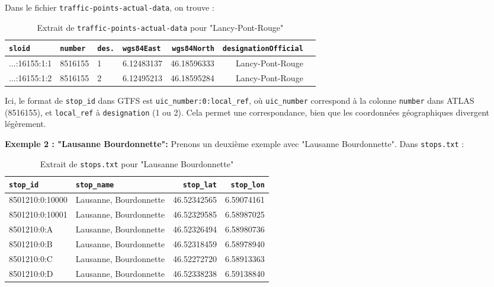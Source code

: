 Dans le fichier \texttt{traffic-points-actual-data}, on trouve :

\begin{table}[H]
\caption{Extrait de \texttt{traffic-points-actual-data} pour "Lancy-Pont-Rouge"}
\label{tab:traffic_lancy_2}
\centering
\begin{tabular}{l l l l r r l}
\toprule
\texttt{sloid} & \texttt{number} & \texttt{des.} & \texttt{wgs84East} & \texttt{wgs84North} & \texttt{designationOfficial} \\
\midrule
...:16155:1:1 & 8516155 & 1  & 6.12483137 & 46.18596333 & Lancy-Pont-Rouge \\
...:16155:1:2 & 8516155 & 2  & 6.12495213 & 46.18595284 & Lancy-Pont-Rouge \\
\bottomrule
\end{tabular}
\end{table}

Ici, le format de \texttt{stop\_id} dans GTFS est \texttt{uic\_number:0:local\_ref}, où \texttt{uic\_number} correspond à la colonne \texttt{number} dans ATLAS (8516155), et \texttt{local\_ref} à \texttt{designation} (1 ou 2). Cela permet une correspondance, bien que les coordonnées géographiques divergent légèrement.

\textbf{Exemple 2 : "Lausanne Bourdonnette":}
\newline
Prenons un deuxième exemple avec "Lausanne Bourdonnette". Dans \texttt{stops.txt} :
\begin{table}[H]
\caption{Extrait de \texttt{stops.txt} pour "Lausanne Bourdonnette"}
\label{tab:stops_bourdonnette_2}
\centering
\begin{tabular}{l l r r}
\toprule
\texttt{stop\_id} & \texttt{stop\_name} & \texttt{stop\_lat} & \texttt{stop\_lon} \\
\midrule
8501210:0:10000 & Lausanne, Bourdonnette & 46.52342565 & 6.59074161 \\
8501210:0:10001 & Lausanne, Bourdonnette & 46.52329585 & 6.58987025 \\
8501210:0:A & Lausanne, Bourdonnette & 46.52326494 & 6.58980736 \\
8501210:0:B & Lausanne, Bourdonnette & 46.52318459 & 6.58978940 \\
8501210:0:C & Lausanne, Bourdonnette & 46.52272720 & 6.58913363 \\
8501210:0:D & Lausanne, Bourdonnette & 46.52338238 & 6.59138840 \\
\bottomrule
\end{tabular}
\end{table}

